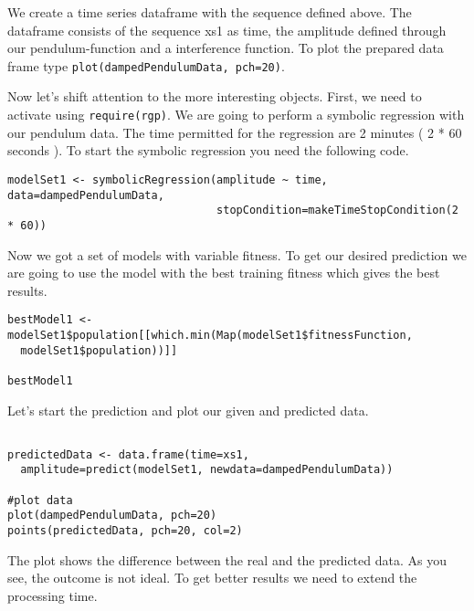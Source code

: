 We create a time series dataframe with the sequence defined above. 
The dataframe consists of the sequence xs1 as time, the amplitude defined through our pendulum-function and a
interference function.
To plot the prepared data frame type \lstinline!plot(dampedPendulumData, pch=20)!.

Now let's shift attention to the more interesting objects.
First, we need to activate \RGP using \lstinline!require(rgp)!.
We are going to perform a symbolic regression with our pendulum data.
The time permitted for the regression are 2 minutes ( 2 * 60 seconds ).
To start the symbolic regression you need the following code.

\begin{lstlisting}[caption = {Symbolic Regression }, label = tutsymbolicregression]
modelSet1 <- symbolicRegression(amplitude ~ time, data=dampedPendulumData,
                                stopCondition=makeTimeStopCondition(2 * 60))
\end{lstlisting}

Now we got a set of models with variable fitness. 
To get our desired prediction we are going to use the model with the best training fitness
which gives the best results.

\begin{lstlisting}[caption = {Best Model}, label = tutbestmodel]
bestModel1 <- modelSet1$population[[which.min(Map(modelSet1$fitnessFunction, 
  modelSet1$population))]]

bestModel1
\end{lstlisting}

Let's start the prediction and plot our given and predicted data. 

\begin{lstlisting}[caption = {Prediction}, label = tutPrediction]

predictedData <- data.frame(time=xs1,
  amplitude=predict(modelSet1, newdata=dampedPendulumData))

#plot data
plot(dampedPendulumData, pch=20)
points(predictedData, pch=20, col=2)

\end{lstlisting}

The plot shows the difference between the real and the predicted data. 
As you see, the outcome is not ideal. To get better results we need to extend the processing time.


